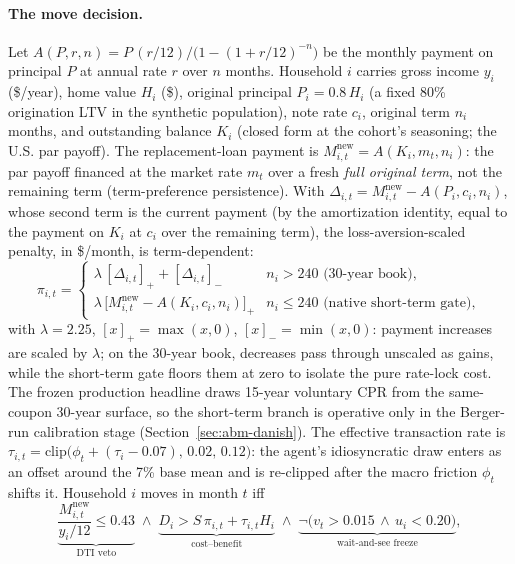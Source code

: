 \documentclass[12pt]{article}
\begin{document}
\paragraph{The move decision.}
Let $A(P,r,n) = P\,(r/12)\big/\big(1-(1+r/12)^{-n}\big)$ be the monthly payment on principal $P$ at annual rate $r$ over $n$ months. %
Household $i$ carries gross income $y_i$ (\$/year), home value $H_i$ (\$), original principal $P_i = 0.8\,H_i$ (a fixed 80\% origination LTV in the synthetic population), note rate $c_i$, original term $n_i$ months, and outstanding balance $K_i$ (closed form at the cohort's seasoning; the U.S. par payoff). %
The replacement-loan payment is $M^{\mathrm{new}}_{i,t} = A(K_i, m_t, n_i)$: the par payoff financed at the market rate $m_t$ over a fresh \emph{full original term}, not the remaining term (term-preference persistence). %
With $\Delta_{i,t} = M^{\mathrm{new}}_{i,t} - A(P_i, c_i, n_i)$, whose second term is the current payment (by the amortization identity, equal to the payment on $K_i$ at $c_i$ over the remaining term), the loss-aversion-scaled penalty, in \$/month, is term-dependent:
\begin{equation}\label{eq:abmpenalty}
\pi_{i,t} =
\begin{cases}
\lambda\,[\Delta_{i,t}]_{+} + [\Delta_{i,t}]_{-} & n_i > 240 \text{ (30-year book)},\\
\lambda\,\big[M^{\mathrm{new}}_{i,t} - A(K_i, c_i, n_i)\big]_{+} & n_i \le 240 \text{ (native short-term gate)},
\end{cases}
\end{equation}
with $\lambda = 2.25$, $[x]_{+} = \max(x,0)$, $[x]_{-} = \min(x,0)$: payment increases are scaled by $\lambda$; on the 30-year book, decreases pass through unscaled as gains, while the short-term gate floors them at zero to isolate the pure rate-lock cost. The frozen production headline draws 15-year voluntary CPR from the same-coupon 30-year surface, so the short-term branch is operative only in the Berger-run calibration stage (Section~\ref{sec:abm-danish}).
The effective transaction rate is $\tau_{i,t} = \mathrm{clip}\big(\phi_t + (\tau_i - 0.07),\,0.02,\,0.12\big)$: the agent's idiosyncratic draw enters as an offset around the 7\% base mean and is re-clipped after the macro friction $\phi_t$ shifts it. %
Household $i$ moves in month $t$ iff
\begin{equation}\label{eq:abmmove}
\underbrace{\frac{M^{\mathrm{new}}_{i,t}}{y_i/12} \le 0.43}_{\text{DTI veto}}
\;\wedge\;
\underbrace{D_i > S\,\pi_{i,t} + \tau_{i,t} H_i}_{\text{cost--benefit}}
\;\wedge\;
\underbrace{\neg\big(v_t > 0.015 \,\wedge\, u_i < 0.20\big)}_{\text{wait-and-see freeze}},
\end{equation}
\end{document}
